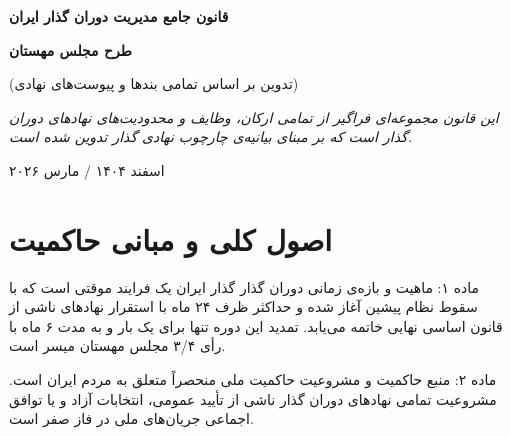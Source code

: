 \documentclass[12pt,a4paper,oneside]{report}
\begin{document}
\begin{titlepage}
    \centering
    \vspace*{2cm}
    {\Huge\bfseries\color{MahestanDarkBlue} قانون جامع مدیریت دوران گذار ایران \par}
    \vspace{1cm}
    {\huge\bfseries\color{MahestanGold} طرح مجلس مهستان \par}
    \vspace{0.8cm}
    {\Large (تدوین بر اساس تمامی بندها و پیوست‌های نهادی) \par}
    \vfill
    \begin{tcolorbox}[colback=MahestanBlue!5, colframe=MahestanBlue, arc=10pt, width=0.8\textwidth]
        \centering\itshape
        این قانون مجموعه‌ای فراگیر از تمامی ارکان، وظایف و محدودیت‌های نهادهای دوران گذار است که بر مبنای بیانیه‌ی چارچوب نهادی گذار تدوین شده است.
    \end{tcolorbox}
    \vfill
    {\small اسفند ۱۴۰۴ / مارس ۲۰۲۶ \par}
\end{titlepage}

\tableofcontents
\newpage

\chapter{اصول کلی و مبانی حاکمیت}

\begin{articlebox}{ماده ۱: ماهیت و بازه‌ی زمانی دوران گذار}
گذار ایران یک فرایند موقتی است که با سقوط نظام پیشین آغاز شده و حداکثر ظرف ۲۴ ماه با استقرار نهادهای ناشی از قانون اساسی نهایی خاتمه می‌یابد. تمدید این دوره تنها برای یک بار و به مدت ۶ ماه با رأی ۳/۴ مجلس مهستان میسر است.
\end{articlebox}

\begin{articlebox}{ماده ۲: منبع حاکمیت و مشروعیت}
حاکمیت ملی منحصراً متعلق به مردم ایران است. مشروعیت تمامی نهادهای دوران گذار ناشی از تأیید عمومی، انتخابات آزاد و یا توافق اجماعی جریان‌های ملی در فاز صفر است.
\end{articlebox}
\end{document}
